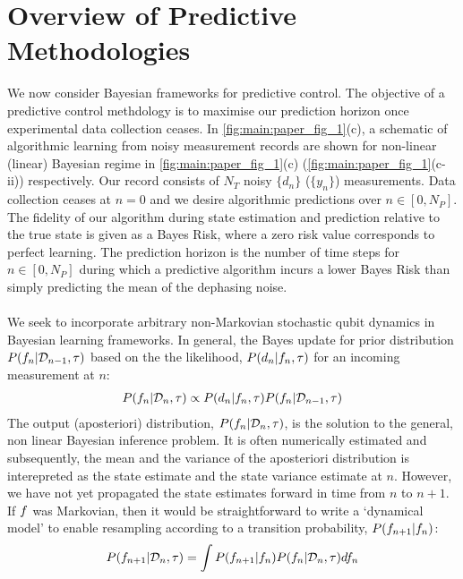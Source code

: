\section{Overview of Predictive Methodologies}  \label{sec:main:2}

We now consider Bayesian frameworks for predictive control. The objective of a  predictive control methdology is to maximise our prediction horizon once experimental data collection ceases. In \cref{fig:main:paper_fig_1}(c), a schematic of algorithmic learning from noisy measurement records are shown for non-linear (linear) Bayesian regime in \cref{fig:main:paper_fig_1}(c) (\cref{fig:main:paper_fig_1}(c-ii)) respectively. Our record consists of $N_T$ noisy $\{ d_n\}$ ($\{ y_n\}$) measurements. Data collection ceases at $n=0$  and we desire algorithmic predictions over $ n \in [0, N_P]$. The fidelity of our algorithm during state estimation and prediction relative to the true state is given as a Bayes Risk, where a zero risk value corresponds to perfect learning. The prediction horizon is the number of time steps for $ n \in [0, N_P]$ during which a predictive algorithm incurs a lower Bayes Risk than simply predicting the mean of the dephasing noise.
\\
\\
We seek to incorporate arbitrary non-Markovian stochastic qubit dynamics in Bayesian learning frameworks. In general, the Bayes update for prior distribution $P(f_n | \mathcal{D}_{n-1}, \tau)$ based on the the likelihood, $P(d_n | f_n, \tau)$ for an incoming measurement at $n$: 
\begin{align}
P(f_n| \mathcal{D}_n, \tau)  \propto P(d_n | f_n, \tau) P(f_n | \mathcal{D}_{n-1}, \tau)
\end{align}
The output (aposteriori) distribution, $P(f_n| \mathcal{D}_n, \tau)$, is the solution to the general, non linear Bayesian inference problem. It is often numerically estimated and subsequently, the mean and the variance of the aposteriori distribution is interepreted as the state estimate and the state variance estimate at $n$. However, we have not yet propagated the state estimates forward in time from $n$ to $n+1$. If $f$ was Markovian, then it would be straightforward to write a `dynamical model' to enable resampling according to a transition probability, $P(f_{n+1} | f_n)$:
\begin{align}
P(f_{n+1} | \mathcal{D}_{n}, \tau) = \int P(f_{n+1} | f_n) P(f_n | \mathcal{D}_{n}, \tau) df_n
\end{align}

